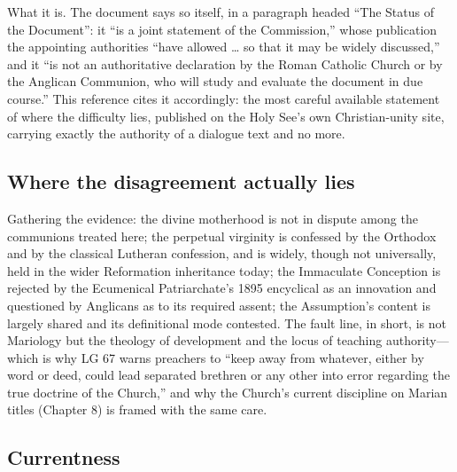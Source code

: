 What it is. The document says so itself, in a paragraph headed ``The
Status of the Document'': it ``is a joint statement of the Commission,''
whose publication the appointing authorities ``have allowed \ldots{} so
that it may be widely discussed,'' and it ``is not an authoritative
declaration by the Roman Catholic Church or by the Anglican Communion,
who will study and evaluate the document in due course.'' This reference
cites it accordingly: the most careful available statement of where the
difficulty lies, published on the Holy See's own Christian-unity site,
carrying exactly the authority of a dialogue text and no more.

\subsection*{Where the disagreement actually lies}

Gathering the evidence: the divine motherhood is not in dispute among the
communions treated here; the perpetual virginity is confessed by the
Orthodox and by the classical Lutheran confession, and is widely, though
not universally, held in the wider Reformation inheritance today; the
Immaculate Conception is rejected by the Ecumenical Patriarchate's 1895
encyclical as an innovation and questioned by Anglicans as to its
required assent; the Assumption's content is largely shared and its
definitional mode contested. The fault line, in short, is not Mariology
but the theology of development and the locus of teaching
authority---which is why LG 67 warns preachers to ``keep away from
whatever, either by word or deed, could lead separated brethren or any
other into error regarding the true doctrine of the Church,'' and why the
Church's current discipline on Marian titles (Chapter 8) is framed with
the same care.

\subsection*{Currentness}

